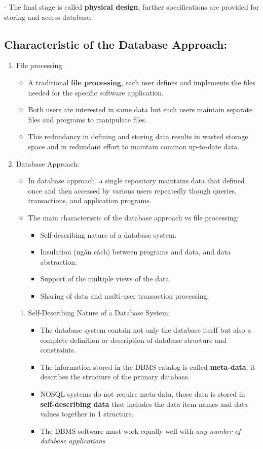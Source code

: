 \documentclass[10pt]{article}
\newcommand{\tf}{\textbf}
\newcommand{\ti}{\textit}
\begin{document}
	- The final stage is called \tf{physical design}, further specifications are provided for storing and access database. \\

\subsection{Characteristic of the Database Approach: }
\begin{enumerate}
	\item File processing:
	\begin{itemize}
		\item A traditional \tf{file processing}, each user defines and implements the files needed for the specific software application.
		\item Both users are interested in same data but each users maintain separate files and programs to manipulate files.
		\item This redundancy in defining and storing data results in wasted storage space and in redundant effort to maintain common up-to-date data.
	\end{itemize}

	\item Database Approach:
	\begin{itemize}
		\item In database approach, a single repository maintains data that defined once and then accessed by various users repeatedly though queries, transactions, and application programs.
		\item The main characteristic of the database approach vs file processing:
		\begin{itemize}
			\item Self-describing nature of a database system.
			\item Insulation (ngăn cách) between programs and data, and data abstraction.
			\item Support of the multiple views of the data.
			\item Sharing of data and multi-user transaction processing.
		\end{itemize}
	\end{itemize}

	\begin{enumerate}
		\item Self-Describing Nature of a Database System:
		\begin{itemize}
			\item The database system contain not only the database itself but also a complete definition or description of database structure and constraints.
			\item The information stored in the DBMS catalog is called \tf{meta-data}, it describes the structure of the primary database.
			\item NOSQL systems do not require meta-data, those data is stored in \tf{self-describing data} that includes the data item names and data values together in 1 structure.
			\item The DBMS software must work equally well with \ti{any number of database applications}
		\end{itemize}


\end{enumerate}
\end{enumerate}
\end{document}
